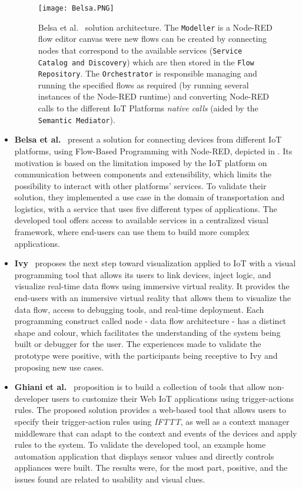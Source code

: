 \begin{itemize}

\begin{figure}[h]
\centering
\texttt{[image: Belsa.PNG]}
\caption[Belsa et al. solution architecture.]{Belsa et al.~\cite{Belsa2018} solution architecture. The \texttt{Modeller} is a Node-RED flow editor canvas were new flows can be created by connecting nodes that correspond to the available services (\texttt{Service Catalog and Discovery}) which are then stored in the \texttt{Flow Repository}. The \texttt{Orchestrator} is responsible managing and running the specified flows as required (by running several instances of the Node-RED runtime) and converting Node-RED calls to the different IoT Platforms \textit{native calls} (aided by the \texttt{Semantic Mediator}).}
\label{fig:belsa}
\end{figure}

\item\textbf{Belsa et al.}~\cite{Belsa2018} present a solution for connecting devices from different IoT platforms, using Flow-Based Programming with Node-RED, depicted in . Its motivation is based on the limitation imposed by the IoT platform on communication between components and extensibility, which limits the possibility to interact with other platforms' services. To validate their solution, they implemented a use case in the domain of transportation and logistics, with a service that uses five different types of applications. The developed tool offers access to available services in a centralized visual framework, where end-users can use them to build more complex applications.

\item\textbf{Ivy}~\cite{ivy} proposes the next step toward visualization applied to IoT with a visual programming tool that allows its users to link devices, inject logic, and visualize real-time data flows using immersive virtual reality. It provides the end-users with an immersive virtual reality that allows them to visualize the data flow, access to debugging tools, and real-time deployment. Each programming construct called node - data flow architecture - has a distinct shape and colour, which facilitates the understanding of the system being built or debugger for the user. The experiences made to validate the prototype were positive, with the participants being receptive to Ivy and proposing new use cases.

\item\textbf{Ghiani et al.}~\cite{personalization_of_context_dependent_apps} proposition is to build a collection of tools that allow non-developer users to customize their Web IoT applications using trigger-actions rules. The proposed solution provides a web-based tool that allows users to specify their trigger-action rules using \textit{IFTTT}, as well as a context manager middleware that can adapt to the context and events of the devices and apply rules to the system. To validate the developed tool, an example home automation application that displays sensor values and directly controls appliances were built. The results were, for the most part, positive, and the issues found are related to usability and visual clues.


\end{itemize}
